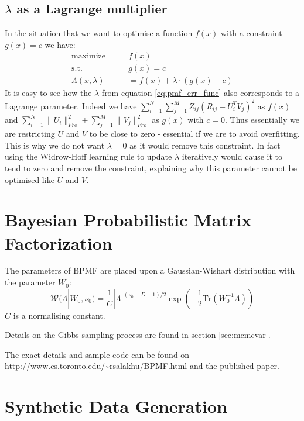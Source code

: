 \subsection{$\lambda$ as a Lagrange multiplier}
\label{sec:lag_lambd_optim}
In the situation that we want to optimise a function $f(x)$ with a constraint $g(x)=c$ we have:
\begin{align*}
\text{maximize} \qquad & f(x) \\
\text{s.t.} \qquad & g(x)=c \\
\Lambda(x,\lambda) &= f(x) + \lambda \cdot \left(g(x)-c\right)
\end{align*}
It is easy to see how the $\lambda$ from equation \ref{eq:pmf_err_func} also corresponds to a Lagrange parameter. Indeed we have $\sum_{i=1}^{N} \sum_{j=1}^{M} Z_{ij}(R_{ij}-U_i^TV_j)^2$ as $f(x)$ and $\sum_{i=1}^{N} \|U_i\|_{Fro}^2 +  \sum_{j=1}^{M} \|V_j\|_{Fro}^2$ as $g(x)$ with $c=0$. Thus essentially we are restricting $U$ and $V$ to be close to zero - essential if we are to avoid overfitting. This is why we do not want $\lambda = 0$ as it would remove this constraint. In fact using the Widrow-Hoff learning rule to update $\lambda$ iteratively would cause it to tend to zero and remove the constraint, explaining why this parameter cannot be optimised like $U$ and $V$.

\section{Bayesian Probabilistic Matrix Factorization}
\label{sec:app_bpmf}

The parameters of BPMF are placed upon a Gaussian-Wishart distribution  with the parameter $W_0$:
\begin{equation*}
\mathcal{W}(\Lambda| W_0,\nu_0) = \frac{1}{C} |\Lambda|^{(\nu_0-D-1)/2} \exp \left(-\frac{1}{2}\text{Tr}(W_0^{-1}\Lambda)\right)
\end{equation*}
$C$ is a normalising constant.

Details on the Gibbs sampling process are found in section \ref{sec:mcmcvar}.

The exact details and sample code can be found on \url{http://www.cs.toronto.edu/~rsalakhu/BPMF.html} and the published paper.

\section{Synthetic Data Generation}

